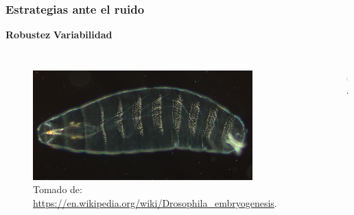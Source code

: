 \documentclass[10pt]{beamer}
\begin{document}
\begin{frame}
\frametitle{Estrategias ante el ruido}
\hspace{20 mm} \textbf{Robustez} \hspace{40 mm} \textbf{Variabilidad}
\begin{columns}[c]
\begin{figure}[p]
    \centering
    \includegraphics[width=0.9\textwidth]{drosophila.jpg}\\
    \tiny Tomado de: \url{https://en.wikipedia.org/wiki/Drosophila_embryogenesis}.
\end{figure}

\begin{figure}[p]
    \centering
    \includegraphics[width=0.7\textwidth]{lambda.jpg}\\
    \tiny \cite{cooper00}.
\end{figure}
\end{columns}
\end{frame}
\end{document}
